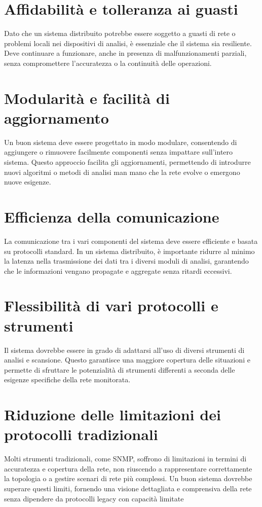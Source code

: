 \documentclass[target=bach,aauheader=,style=]{thud}
\begin{document}
\section{Affidabilità e tolleranza ai guasti}
Dato che un sistema distribuito potrebbe essere soggetto a guasti di rete o problemi locali nei dispositivi di analisi, è essenziale che il sistema sia resiliente. Deve continuare a funzionare, anche in presenza di malfunzionamenti parziali, senza compromettere l'accuratezza o la continuità delle operazioni.

\section{Modularità e facilità di aggiornamento}
Un buon sistema deve essere progettato in modo modulare, consentendo di aggiungere o rimuovere facilmente componenti senza impattare sull'intero sistema. Questo approccio facilita gli aggiornamenti, permettendo di introdurre nuovi algoritmi o metodi di analisi man mano che la rete evolve o emergono nuove esigenze.

\section{Efficienza della comunicazione}
La comunicazione tra i vari componenti del sistema deve essere efficiente e basata su protocolli standard. In un sistema distribuito, è importante ridurre al minimo la latenza nella trasmissione dei dati tra i diversi moduli di analisi, garantendo che le informazioni vengano propagate e aggregate senza ritardi eccessivi.

\section{Flessibilità di vari protocolli e strumenti} Il sistema dovrebbe essere in grado di adattarsi all'uso di diversi strumenti di analisi e scansione. Questo garantisce una maggiore copertura delle situazioni e permette di sfruttare le potenzialità di strumenti differenti a seconda delle esigenze specifiche della rete monitorata.

\section{Riduzione delle limitazioni dei protocolli tradizionali}
Molti strumenti tradizionali, come SNMP, soffrono di limitazioni in termini di accuratezza e copertura della rete, non riuscendo a rappresentare correttamente la topologia o a gestire scenari di rete più complessi. Un buon sistema dovrebbe superare questi limiti, fornendo una visione dettagliata e comprensiva della rete senza dipendere da protocolli legacy con capacità limitate
\end{document}
